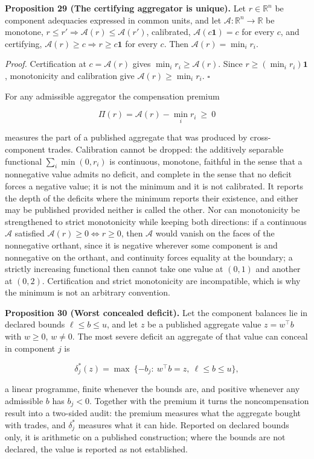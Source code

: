 \documentclass[11pt]{article}
\begin{document}
\textbf{Proposition 29 (The certifying aggregator is unique).} Let \(r\in\mathbb R^{n}\) be component adequacies expressed in common units, and let \(\mathcal A:\mathbb R^{n}\to\mathbb R\) be monotone, \(r\le r'\Rightarrow\mathcal A(r)\le\mathcal A(r')\), calibrated, \(\mathcal A(c\mathbf 1)=c\) for every \(c\), and certifying, \(\mathcal A(r)\ge c\Rightarrow r\ge c\mathbf 1\) for every \(c\). Then \(\mathcal A(r)=\min_ir_i\).

\emph{Proof.} Certification at \(c=\mathcal A(r)\) gives \(\min_ir_i\ge\mathcal A(r)\). Since \(r\ge(\min_ir_i)\mathbf 1\), monotonicity and calibration give \(\mathcal A(r)\ge\min_ir_i\). \(\square\)

For any admissible aggregator the compensation premium 

$$\Pi(r)=\mathcal A(r)-\min_ir_i\ \ge\ 0$$

 measures the part of a published aggregate that was produced by cross-component trades. Calibration cannot be dropped: the additively separable functional \(\sum_i\min(0,r_i)\) is continuous, monotone, faithful in the sense that a nonnegative value admits no deficit, and complete in the sense that no deficit forces a negative value; it is not the minimum and it is not calibrated. It reports the depth of the deficits where the minimum reports their existence, and either may be published provided neither is called the other. Nor can monotonicity be strengthened to strict monotonicity while keeping both directions: if a continuous \(\mathcal A\) satisfied \(\mathcal A(r)\ge0\Leftrightarrow r\ge0\), then \(\mathcal A\) would vanish on the faces of the nonnegative orthant, since it is negative wherever some component is and nonnegative on the orthant, and continuity forces equality at the boundary; a strictly increasing functional then cannot take one value at \((0,1)\) and another at \((0,2)\). Certification and strict monotonicity are incompatible, which is why the minimum is not an arbitrary convention.

\textbf{Proposition 30 (Worst concealed deficit).} Let the component balances lie in declared bounds \(\ell\le b\le u\), and let \(z\) be a published aggregate value \(z=w^{\top}b\) with \(w\ge0\), \(w\ne0\). The most severe deficit an aggregate of that value can conceal in component \(j\) is 

$$\delta^{*}_j(z)=\max\ \{-b_j:\ w^{\top}b=z,\ \ell\le b\le u\},$$

 a linear programme, finite whenever the bounds are, and positive whenever any admissible \(b\) has \(b_j<0\). Together with the premium it turns the noncompensation result into a two-sided audit: the premium measures what the aggregate bought with trades, and \(\delta^{*}_j\) measures what it can hide. Reported on declared bounds only, it is arithmetic on a published construction; where the bounds are not declared, the value is reported as not established.
\end{document}
